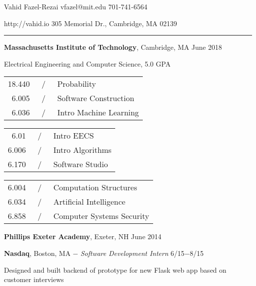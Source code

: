 \documentclass[11pt]{article}
\newcommand{\msection}[1]{\vspace{1em}\marginnote{#1}} %
\newcommand{\bt}[1]{\textbf{#1}} %
\newcommand{\gap}[0]{\vspace{0.5em}} %
\newcommand{\dash}[0]{ $-$ } %
\newcommand{\tabsep}[0]{\, / \,} %
\begin{document}

{\huge Vahid Fazel-Rezai} \hfill vfazel@mit.edu \hspace{4.5em} 701-741-6564

\vspace{0.5em}

http://vahid.io \hfill 305 Memorial Dr., Cambridge, MA 02139

\vspace{0.2em}

\hspace{-1.2in}\rule{7.9in}{0.2em}

\vspace{-0.4em}



\msection{Education}

\bt{Massachusetts Institute of Technology}, Cambridge, MA \hfill June 2018

Electrical Engineering and Computer Science, 5.0 GPA
\vspace{0.15em}

\begin{tabular}{rcl}
18.440 & \tabsep & Probability \\
6.005 & \tabsep & Software Construction \\
6.036 & \tabsep & Intro Machine Learning
\end{tabular}
\hfill
\begin{tabular}{rcl}
6.01 & \tabsep & Intro EECS \\
6.006 & \tabsep & Intro Algorithms \\
6.170 & \tabsep & Software Studio
\end{tabular}
\hfill
\begin{tabular}{rcl}
6.004 & \tabsep & Computation Structures \\
6.034 & \tabsep & Artificial Intelligence \\
6.858 & \tabsep & Computer Systems Security
\end{tabular}

\gap

\bt{Phillips Exeter Academy}, Exeter, NH \hfill June 2014



\msection{Work}

\bt{Nasdaq}, Boston, MA\dash \emph{Software Development Intern} \hfill 6/15$-$8/15

Designed and built backend of prototype for new Flask web app based on customer interviews
\end{document}
